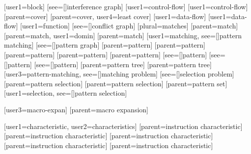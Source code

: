 
[user1={block}]
[see=[\seename]{interference graph}]
[user1={control-flow}]
[user1={control-flow}]
[parent={cover}]
[parent={cover}, user4={least cover}]
[user1={data-flow}]
[user1={data-flow}]
[user1={function}]
[see=[\seename]{conflict graph}]
[plural=matches]
[parent={match}]
[parent={match}, user1={domin}]
[parent={match}]
%
        [user1={matching}, see=[\seename]{pattern matching}]
[see=[\seename]{pattern graph}]
[parent={pattern}]
[parent={pattern}]
[parent={pattern}]
[parent={pattern}]
[parent={pattern}]
[see=[\seename]{pattern}]
[see=[\seename]{pattern}]
[see=[\seename]{pattern}]
[parent={pattern tree}]
[parent={pattern tree}]
%
        [user3={pattern-matching}, see=[\seename]{matching problem}]
[see=[\seename]{selection problem}]
[parent={pattern selection}]
[parent={pattern selection}]
[parent={pattern set}]
%
        [user1={selection}, see=[\seename]{pattern selection}]



[user3={macro-expan}]
[parent={macro expansion}]

%
        [user1={characteristic}, user2={characteristics}]
%
        [parent={instruction characteristic}]
%
        [parent={instruction characteristic}]
%
        [parent={instruction characteristic}]
%
        [parent={instruction characteristic}]
%
        [parent={instruction characteristic}]

